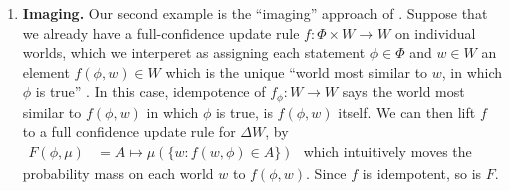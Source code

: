 \begin{enumerate}[wide, label=\textbf{\thesubsection.\arabic*}]
	\item
	\textbf{Imaging.}
	Our second example is the ``imaging''
	approach of \textcite{lewis1976probabilities}.
	Suppose that
 	we already have a full-confidence update rule
	$f : \Phi \times W \to W$ on individual worlds, which we interperet as assigning each statement $\phi \in \Phi$ and $w \in W$ an element $f(\phi, w) \in W$ which is the unique ``world most similar to $w$, in which $\phi$ is true'' \parencite{gardenfors1979imaging}.
	In this case, idempotence of $f_\phi: W \to W$
	says the world most similar to $f(\phi,w)$ in which $\phi$ is true, is $f(\phi,w)$ itself.
	We can then 
	lift $f$ to a full confidence update rule for $\Delta W$,
	by
	$
    	\begin{aligned}
    		F(\phi, \mu) 
    			&= A \mapsto \mu(\{w : f(w, \phi) \in A\})
    	\end{aligned}
	$
	which intuitively moves the probability mass on each world $w$ to
	$f(\phi,w)$.	
	Since $f$ is idempotent, so is $F$.


\end{enumerate}

